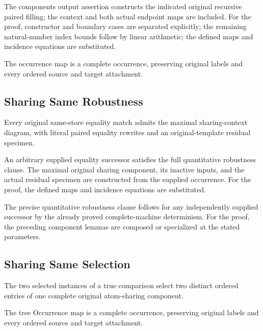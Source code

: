The components output assertion constructs the indicated original recursive paired filling; the context and both actual endpoint maps are included.
For the proof, constructor and boundary cases are separated explicitly; the remaining natural-number index bounds follow by linear arithmetic; the defined maps and incidence equations are substituted.
\par{}

The occurrence map is a complete occurrence, preserving original labels and every ordered source and target attachment.
\par{}

\subsection{Sharing Same Robustness}
Every original same-store equality match admits the maximal sharing-context diagram, with literal paired equality rewrites and an original-template residual specimen.

An arbitrary supplied equality successor satisfies the full quantitative robustness clause. The maximal original sharing component, its inactive inputs, and the actual residual specimen are constructed from the supplied occurrence.
For the proof, the defined maps and incidence equations are substituted.
\par{}

The precise quantitative robustness clause follows for any independently supplied successor by the already proved complete-machine determinism.
For the proof, the preceding component lemmas are composed or specialized at the stated parameters.
\par{}

\subsection{Sharing Same Selection}
The two selected instances of a true comparison select two distinct ordered entries of one complete original atom-sharing component.

The tree Occurrence map is a complete occurrence, preserving original labels and every ordered source and target attachment.
\par{}

